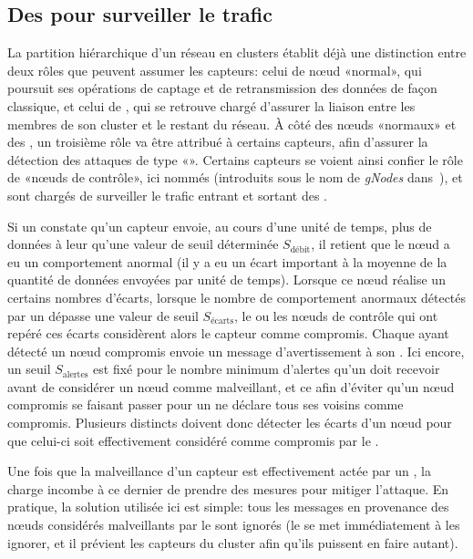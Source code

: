     \subsection{Des \cns pour surveiller le trafic}

La partition hiérarchique d'un réseau en clusters établit déjà une distinction entre deux rôles que peuvent assumer les capteurs: celui de nœud «normal», qui poursuit ses opérations de captage et de retransmission des données de façon classique, et celui de \ch, qui se retrouve chargé d'assurer la liaison entre les membres de son cluster et le restant du réseau.
À côté des nœuds «normaux» et des \chs, un troisième rôle va être attribué à certains capteurs, afin d'assurer la détection des attaques de type «\dds».
Certains capteurs se voient ainsi confier le rôle de «nœuds de contrôle», ici nommés \cns (introduits sous le nom de \textit{gNodes} dans~\cite{LC08}), et sont chargés de surveiller le trafic entrant et sortant des \chs.

Si un \cn constate qu'un capteur envoie, au cours d'une unité de temps, plus de données à leur \CH qu'une valeur de seuil déterminée $S_{\textrm{débit}}$, il retient que le nœud a eu un comportement anormal (il y a eu un écart important à la moyenne de la quantité de données envoyées par unité de temps).
Lorsque ce nœud réalise un certains nombres d'écarts, \cad lorsque le nombre de comportement anormaux détectés par un \cn dépasse une valeur de seuil $S_{\textrm{écarts}}$, le ou les nœuds de contrôle qui ont repéré ces écarts considèrent alors le capteur comme compromis.
Chaque \cn ayant détecté un nœud compromis envoie un message d'avertissement à son \ch.
Ici encore, un seuil $S_{\textrm{alertes}}$ est fixé pour le nombre minimum d'alertes qu'un \CH doit recevoir avant de considérer un nœud comme malveillant, et ce afin d'éviter qu'un nœud compromis se faisant passer pour un \cn ne déclare tous ses voisins comme compromis.
Plusieurs \cns distincts doivent donc détecter les écarts d'un nœud pour que celui-ci soit effectivement considéré comme compromis par le \ch.

Une fois que la malveillance d'un capteur est effectivement actée par un \ch, la charge incombe à ce dernier de prendre des mesures pour mitiger l'attaque.
En pratique, la solution utilisée ici est simple: tous les messages en provenance des nœuds considérés malveillants par le \ch sont ignorés (le \CH se met immédiatement à les ignorer, et il prévient les capteurs du cluster afin qu'ils puissent en faire autant).

